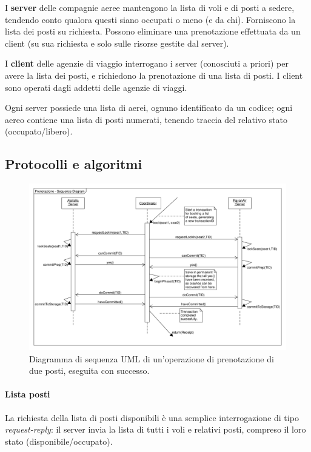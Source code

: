 \documentclass[a4paper]{article}
\begin{document}
I \textbf{server} delle compagnie aeree mantengono la lista di voli e di posti a sedere, tendendo conto qualora questi siano occupati o meno (e da chi). Forniscono la lista dei posti su richiesta. Possono eliminare una prenotazione effettuata da un client (su sua richiesta e solo sulle risorse gestite dal server).

I \textbf{client} delle agenzie di viaggio interrogano i server (conosciuti a priori) per avere la lista dei posti, e richiedono la prenotazione di una lista di posti. I client sono operati dagli addetti delle agenzie di viaggi.

Ogni server possiede una lista di aerei, ognuno identificato da un codice; ogni aereo contiene una lista di posti numerati, tenendo traccia del relativo stato (occupato/libero).


\subsection{Protocolli e algoritmi}
\begin{figure}[t]
	\centering
		\includegraphics[width=\textwidth]{fig/reserve_sequence.pdf}
		\caption{Diagramma di sequenza UML di un'operazione di prenotazione di due posti, eseguita con successo.}
		\label{fig:bookseq}
\end{figure}

\paragraph{Lista posti}La richiesta della lista di posti disponibili è una semplice interrogazione di tipo \textit{request-reply}: il server invia la lista di tutti i voli e relativi posti, compreso il loro stato (disponibile/occupato).
\end{document}
